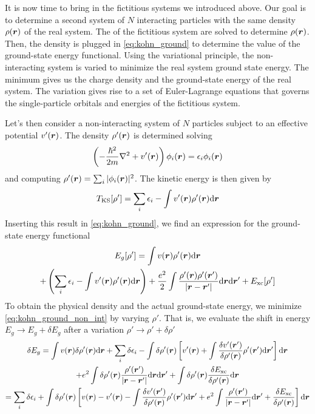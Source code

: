 It is now time to bring in the fictitious systems we introduced above. Our goal is to determine a second system of $N$ interacting particles with the same density $\rho(\mathbf{\boldsymbol{r}})$ of the real system. The \sche of the fictitious system are solved to determine $\rho(\mathbf{\boldsymbol{r}})$. Then, the density is plugged in \cref{eq:kohn_ground} to determine the value of the ground-state energy functional. Using the variational principle, the non-interacting system is varied to minimize the real system ground state energy. The minimum gives us the charge density and the ground-state energy of the real system. The variation gives rise to a set of Euler-Lagrange equations that governs the single-particle orbitals and energies of the fictitious system.

Let's then consider a non-interacting system of $N$ particles subject to an effective potential $v'(\mathbf{\boldsymbol{r}})$. The density $\rho'(\mathbf{\boldsymbol{r}})$ is determined solving
\begin{equation}
    \left(-\frac{\hslash^2}{2m} \laplacian + \rr{v'} \right) \rr{\phi_i} = \epsilon_i \rr{\phi_i}
\end{equation}
and computing $\rho'(\mathbf{\boldsymbol{r}}) = \sum_i |\phi_i(\mathbf{\boldsymbol{r}})|^2$. The kinetic energy is then given by
\begin{equation}
    T_\text{KS}[\rho'] = \sum_i \epsilon_i - \int \rr{v'} \rr{\rho'} \dr
\end{equation}
Inserting this result in \cref{eq:kohn_ground}, we find an expression for the ground-state energy functional
\begin{multline} \label{eq:kohn_ground_non_int}
    E_g[\rho'] = \int \rr{v} \rr{\rho'} \dr
    \\+ \left(\sum_i \epsilon_i - \int \rr{v'} \rr{\rho'} \dr\right) + \frac{e^2}{2} \int \frac{\rho'(\vec{r})\rho'(\vec{r}')}{|\vec{r}-\vec{r}'|}  \dr \dr' + E_\text{xc}[\rho']
\end{multline}
To obtain the physical density and the actual ground-state energy, we minimize \cref{eq:kohn_ground_non_int} by varying $\rho'$. That is, we evaluate the shift in energy $E_g \rightarrow E_g + \delta E_g$ after a variation $\rho' \rightarrow \rho' + \delta\rho'$
\begin{multline} \label{eq:kohn_ground_variation}
    \delta E_g =
    \int \rr{v} \delta\rr{\rho'} \dr
    + \sum_i \delta \epsilon_i
    - \int \delta \rr{\rho'} \left[ \rr{v'} + \int \frac{\delta v'(\vec{r}')}{\delta\rr{\rho'}}\rho'(\vec{r}') \dr' \right] \dr
    \\+ e^2 \int \delta\rr{\rho'} \frac{\rho'(\vec{r}')}{|\vec{r}-\vec{r}'|}  \dr \dr'
    + \int \delta\rr{\rho'} \frac{\delta E_\text{xc}}{\delta\rr{\rho'}} \dr
    \\ = \sum_i \delta \epsilon_i + \int \delta\rr{\rho'} \left[ \rr{v} - \rr{v'} - \int \frac{\delta v'(\vec{r}')}{\delta\rr{\rho'}}\rho'(\vec{r}') \dr' + e^2 \int \frac{\rho'(\vec{r}')}{|\vec{r}-\vec{r}'|} \dr' + \frac{\delta E_\text{xc}}{\delta\rr{\rho'}} \right] \dr
\end{multline}
